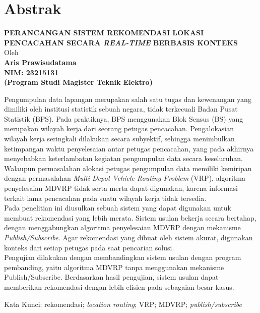 %
%
%

\singlespacing
\chapter*{Abstrak}
\medskip
\begin{center}
	{\large \textbf{PERANCANGAN SISTEM REKOMENDASI LOKASI PENCACAHAN SECARA \textit{REAL-TIME} BERBASIS KONTEKS}} \\
	\medskip
	Oleh \\
	{\large \textbf{Aris Prawisudatama}} \\
	{\large \textbf{NIM: 23215131}} \\
	{\large \textbf{(Program Studi Magister Teknik Elektro)}}
\end{center}
\medskip
\medskip
\medskip
\noindent Pengumpulan data lapangan merupakan salah satu tugas dan kewenangan yang dimiliki oleh institusi statistik sebuah negara, tidak terkecuali Badan Pusat Statistik (BPS). Pada praktiknya, BPS menggunakan Blok Sensus (BS) yang merupakan wilayah kerja dari seorang petugas pencacahan. Pengalokasian wilayah kerja seringkali dilakukan secara subyektif, sehingga menimbulkan ketimpangan waktu penyelesaian antar petugas pencacahan, yang pada akhirnya menyebabkan keterlambatan kegiatan pengumpulan data secara keseluruhan. Walaupun permasalahan alokasi petugas pengumpulan data memiliki kemiripan dengan permasalahan \textit{Multi Depot Vehicle Routing Problem} (VRP), algoritma penyelesaian MDVRP tidak serta merta dapat digunakan, karena informasi terkait lama pencacahan pada suatu wilayah kerja tidak tersedia. \\

\noindent Pada penelitian ini diusulkan sebuah sistem yang dapat digunakan untuk membuat rekomendasi yang lebih merata. Sistem usulan bekerja secara bertahap, dengan menggabungkan algoritma penyelesaian MDVRP dengan mekanisme \textit{Publish/Subscribe}. Agar rekomendasi yang dibuat oleh sistem akurat, digunakan konteks dari setiap petugas pada saat pencarian solusi. \\

\noindent Pengujian dilakukan dengan membandingkan sistem usulan dengan program pembanding, yaitu algoritma MDVRP tanpa menggunakan mekanisme Publish/Subscribe. Berdasarkan hasil pengujian, sistem usulan dapat memberikan rekomendasi dengan lebih efisien pada sebagaian besar kasus.  \\

\vspace*{0.2cm}

\noindent Kata Kunci: rekomendasi; \textit{location routing}; VRP; MDVRP; \textit{publish/subscribe} \\

\onehalfspacing
\newpage